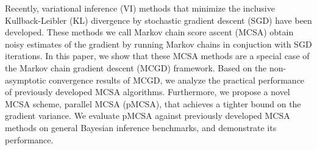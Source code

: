
Recently, variational inference (VI) methods that minimize the inclusive Kullback-Leibler (KL) divergence by stochastic gradient descent (SGD) have been developed.
These methods we call Markov chain score ascent (MCSA) obtain noisy estimates of the gradient by running Markov chains in conjuction with SGD iterations.
In this paper, we show that these MCSA methods are a special case of the Markov chain gradient descent (MCGD) framework.
Based on the non-asymptotic convergence results of MCGD, we analyze the practical performance of previously developed MCSA algorithms.
Furthermore, we propose a novel MCSA scheme, parallel MCSA (pMCSA), that achieves a tighter bound on the gradient variance.
We evaluate pMCSA against previously developed MCSA methods on general Bayesian inference benchmarks, and demonstrate its performance.



